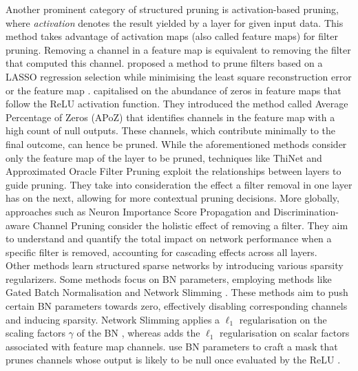 Another prominent category of structured pruning is activation-based pruning,
where \emph{activation} denotes the result yielded by a layer for given input
data. This method takes advantage of activation maps (also called feature maps)
for filter pruning. Removing a channel in a feature map is equivalent to
removing the filter that computed this channel.
\citeauthor{DBLP:conf/iccv/HeZS17} proposed a method to prune filters based on a
LASSO regression selection while minimising the least square reconstruction
error or the feature map \cite{DBLP:conf/iccv/HeZS17}.
\citeauthor{DBLP:journals/corr/HuPTT16} capitalised on the abundance of zeros in
feature maps that follow the \ac{ReLU} activation function. They introduced the
method called Average Percentage of Zeros (APoZ) that identifies channels in the
feature map with a high count of null outputs. These channels, which contribute
minimally to the final outcome, can hence be pruned. While the aforementioned
methods consider only the feature map of the layer to be pruned, techniques like
ThiNet \cite{DBLP:conf/iccv/LuoWL17} and Approximated Oracle Filter Pruning
\cite{DBLP:conf/icml/DingDGHY19} exploit the relationships between layers to
guide pruning. They take into consideration the effect a filter removal in one
layer has on the next, allowing for more contextual pruning decisions. More
globally, approaches such as Neuron Importance Score Propagation
\cite{DBLP:conf/cvpr/Yu00LMHGLD18} and Discrimination-aware Channel Pruning
\cite{DBLP:conf/nips/ZhuangTZLGWHZ18} consider the holistic effect of removing a
filter. They aim to understand and quantify the total impact on network
performance when a specific filter is removed, accounting for cascading effects
across all layers.\\

Other methods learn structured sparse networks by introducing various sparsity
regularizers. Some methods focus on \acl{BN} parameters, employing methods like
Gated Batch Normalisation \cite{DBLP:conf/nips/YouYYM019} and Network Slimming
\cite{DBLP:conf/iccv/LiuLSHYZ17}. These methods aim to push certain BN
parameters towards zero, effectively disabling corresponding channels and
inducing sparsity. Network Slimming applies a $\ell_1$ regularisation on the
scaling factors $\gamma$ of the \ac{BN} \cite{DBLP:conf/iccv/LiuLSHYZ17},
whereas \cite{DBLP:conf/nips/YouYYM019} adds the $\ell_1$ regularisation on
scalar factors associated with feature map channels.
\citeauthor{DBLP:conf/icml/KangH20} use \ac{BN} parameters to craft a mask that
prunes channels whose output is likely to be null once evaluated by the \ac{ReLU}
\cite{DBLP:conf/icml/KangH20}. \\

